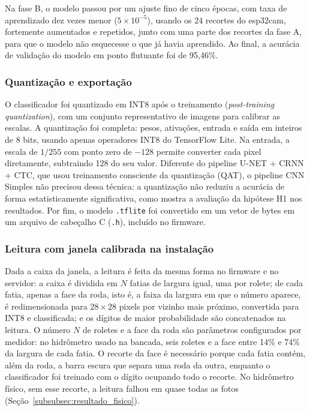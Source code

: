 Na fase B, o modelo passou por um ajuste fino de cinco épocas, com taxa de aprendizado dez
vezes menor ($5 \times 10^{-5}$), usando os 24 recortes do \gls{esp32cam}, fortemente
aumentados e repetidos, junto com uma parte dos recortes da fase A, para que o modelo não
esquecesse o que já havia aprendido. Ao final, a acurácia de validação do modelo em ponto
flutuante foi de 95,46\%.

\subsubsection{Quantização e exportação}
\label{subsubsec:quantizacao_ocr}

O classificador foi quantizado em INT8 após o treinamento (\textit{post-training
quantization}), com um conjunto representativo de imagens para calibrar as escalas. A
quantização foi completa: pesos, ativações, entrada e saída em inteiros de 8 bits, usando
apenas operadores INT8 do TensorFlow Lite. Na entrada, a escala de $1/255$ com ponto zero
de $-128$ permite converter cada pixel diretamente, subtraindo 128 do seu valor. Diferente
do pipeline U-NET + CRNN + CTC, que usou treinamento consciente da quantização (QAT), o
pipeline CNN Simples não
precisou dessa técnica: a quantização não reduziu a acurácia de forma estatisticamente significativa, como mostra a
avaliação da hipótese H1 nos resultados. Por fim, o modelo \texttt{.tflite} foi
convertido em um vetor de bytes em um arquivo de cabeçalho C (\texttt{.h}), incluído no
firmware.

\subsubsection{Leitura com janela calibrada na instalação}
\label{subsubsec:leitura_roi}

Dada a caixa da janela, a leitura é feita da mesma forma no firmware e no servidor: a
caixa é dividida em $N$ fatias de largura igual, uma por rolete; de cada fatia, apenas a
face da roda, isto é, a faixa da largura em que o número aparece, é redimensionada para
$28 \times 28$ pixels por vizinho mais próximo, convertida para INT8 e classificada; e os
dígitos de maior probabilidade são concatenados na leitura. O número $N$ de roletes e a
face da roda são parâmetros configurados por medidor: no hidrômetro usado na bancada, seis
roletes e a face entre 14\% e 74\% da largura de cada fatia. O recorte da face é
necessário porque cada fatia contém, além da roda, a barra escura que separa uma roda da
outra, enquanto o classificador foi treinado com o dígito ocupando todo o recorte. No
hidrômetro físico, sem esse recorte, a leitura falhou em quase todas as fotos
(Seção~\ref{subsubsec:resultado_fisico}).

